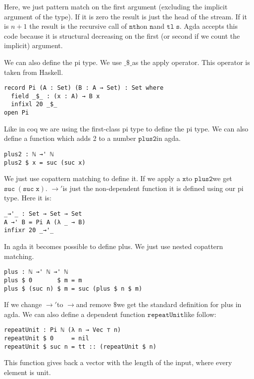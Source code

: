 \documentclass[a4paper,cleardoubleempty,BCOR1cm]{scrbook}
\begin{document}
Here, we just pattern match on the first argument (excluding the implicit
argument of the type).  If it is zero the result is just the head of the
stream.  If it is \(n+1\) the result is the recursive call of $\mathtt{nth}$\;on $\mathtt{n}$\;and
$\mathtt{tl\;s}$.  Agda accepts this code because it is structural decreasing on the
first (or second if we count the implicit) argument.

We can also define the pi type.  We use $\mathtt{\_\$\_}$\;as the apply operator.  This
operator is taken from Haskell.

\begin{verbatim}
record Pi (A : Set) (B : A → Set) : Set where
  field _$_ : (x : A) → B x
  infixl 20 _$_
open Pi
\end{verbatim}

Like in coq we are using the first-class pi type to define the pi type. We
can also define a function which adds 2 to a number $\mathtt{plus2}$\;in agda.

\begin{verbatim}
plus2 : ℕ →' ℕ
plus2 $ x = suc (suc x)
\end{verbatim}

We just use copattern matching to define it. If we apply a $\mathtt{x}$\;to $\mathtt{plus2}$\;we
get \linebreak $\mathtt{suc\;(suc\;x)}$. $\mathtt{\rightarrow'}$\;is just the non-dependent function it is defined
using our pi type. Here it is:

\begin{verbatim}
_→'_ : Set → Set → Set
A →' B = Pi A (λ _ → B)
infixr 20 _→'_
\end{verbatim}

In agda it becomes possible to define plus. We just use nested copattern
matching.

\begin{verbatim}
plus : ℕ →' ℕ →' ℕ
plus $ 0       $ m = m
plus $ (suc n) $ m = suc (plus $ n $ m)
\end{verbatim}

If we change $\mathtt{\rightarrow'}$\;to $\mathtt{\rightarrow}$\;and remove $\mathtt{\$}$\;we get the
standard definition for plus in agda. We can also define a dependent function
$\mathtt{repeatUnit}$\;like follow:
\begin{verbatim}
repeatUnit : Pi ℕ (λ n → Vec ⊤ n)
repeatUnit $ 0     = nil
repeatUnit $ suc n = tt :: (repeatUnit $ n)
\end{verbatim}
This function gives back a vector with the length of the input, where every element
is unit.
\end{document}
